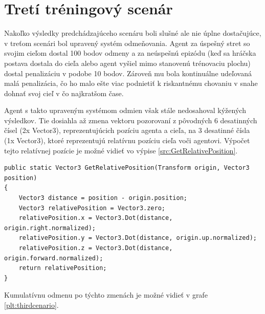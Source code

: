 \documentclass[slovak, master]{diploma}
\begin{document}
\section{Tretí tréningový scenár}
\label{sec:ThirdScenario}
Nakoľko výsledky predchádzajúceho scenáru boli slušné ale nie úplne dostačujúce, v treťom scenári bol upravený systém odmeňovania. Agent za úspešný stret so svojim cieľom dostal 100 bodov odmeny a za neúspešnú epizódu (keď sa hráčska postava dostala do cieľa alebo agent vyšiel mimo stanovenú trénovaciu plochu) dostal penalizáciu v podobe 10 bodov. Zároveň mu bola kontinuálne udeľovaná malá penalizácia, čo ho malo ešte viac podnietiť k riskantnému chovaniu v snahe dohnať svoj cieľ v čo najkratšom čase. 

Agent s takto upraveným systémom odmien však stále nedosahoval kýžených výsledkov. Tie dosiahla až zmena vektoru pozorovaní z pôvodných 6 desatinných čísel (2x Vector3), reprezentujúcich pozíciu agenta a cieľa, na 3 desatinné čísla (1x Vector3), ktoré reprezentujú relatívnu pozíciu cieľa voči agentovi. Výpočet tejto relatívnej pozície je možné vidieť vo výpise \ref{src:GetRelativePosition}.

\vspace{8pt}
\begin{lstlisting}[label=src:GetRelativePosition,caption={Získavanie reltívnej pozície cieľa voči agentovi}]
public static Vector3 GetRelativePosition(Transform origin, Vector3 position)
{
    Vector3 distance = position - origin.position;
    Vector3 relativePosition = Vector3.zero;
    relativePosition.x = Vector3.Dot(distance, origin.right.normalized);
    relativePosition.y = Vector3.Dot(distance, origin.up.normalized);
    relativePosition.z = Vector3.Dot(distance, origin.forward.normalized);
    return relativePosition;
}
\end{lstlisting}

Kumulatívnu odmenu po týchto zmenách je možné vidieť v grafe \ref{plt:thirdcenario}.
\end{document}
